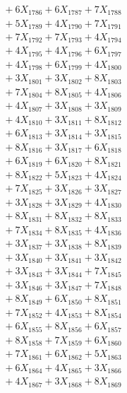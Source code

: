 \documentclass[a4paper,10pt]{article}
\begin{document}
{\begin{align}
&\;  + 6 X_{1786} + 6 X_{1787} + 7 X_{1788} \\[0.3ex]
&\;  + 5 X_{1789} + 4 X_{1790} + 7 X_{1791} \\[0.3ex]
&\;  + 7 X_{1792} + 7 X_{1793} + 4 X_{1794} \\[0.3ex]
&\;  + 4 X_{1795} + 4 X_{1796} + 6 X_{1797} \\[0.3ex]
&\;  + 4 X_{1798} + 6 X_{1799} + 4 X_{1800} \\[0.3ex]
&\;  + 3 X_{1801} + 3 X_{1802} + 8 X_{1803} \\[0.3ex]
&\;  + 7 X_{1804} + 8 X_{1805} + 4 X_{1806} \\[0.3ex]
&\;  + 4 X_{1807} + 3 X_{1808} + 3 X_{1809} \\[0.5ex]\allowbreak
&\;  + 4 X_{1810} + 3 X_{1811} + 8 X_{1812} \\[0.3ex]
&\;  + 6 X_{1813} + 3 X_{1814} + 3 X_{1815} \\[0.3ex]
&\;  + 8 X_{1816} + 3 X_{1817} + 6 X_{1818} \\[0.3ex]
&\;  + 6 X_{1819} + 6 X_{1820} + 8 X_{1821} \\[0.3ex]
&\;  + 8 X_{1822} + 5 X_{1823} + 4 X_{1824} \\[0.3ex]
&\;  + 7 X_{1825} + 3 X_{1826} + 3 X_{1827} \\[0.3ex]
&\;  + 3 X_{1828} + 3 X_{1829} + 4 X_{1830} \\[0.3ex]
&\;  + 8 X_{1831} + 8 X_{1832} + 8 X_{1833} \\[0.3ex]
&\;  + 7 X_{1834} + 8 X_{1835} + 4 X_{1836} \\[0.3ex]
&\;  + 3 X_{1837} + 3 X_{1838} + 8 X_{1839} \\[0.5ex]\allowbreak
&\;  + 3 X_{1840} + 3 X_{1841} + 3 X_{1842} \\[0.3ex]
&\;  + 3 X_{1843} + 3 X_{1844} + 7 X_{1845} \\[0.3ex]
&\;  + 3 X_{1846} + 3 X_{1847} + 7 X_{1848} \\[0.3ex]
&\;  + 8 X_{1849} + 6 X_{1850} + 8 X_{1851} \\[0.3ex]
&\;  + 7 X_{1852} + 4 X_{1853} + 8 X_{1854} \\[0.3ex]
&\;  + 6 X_{1855} + 8 X_{1856} + 6 X_{1857} \\[0.3ex]
&\;  + 8 X_{1858} + 7 X_{1859} + 6 X_{1860} \\[0.3ex]
&\;  + 7 X_{1861} + 6 X_{1862} + 5 X_{1863} \\[0.3ex]
&\;  + 6 X_{1864} + 4 X_{1865} + 3 X_{1866} \\[0.3ex]
&\;  + 4 X_{1867} + 3 X_{1868} + 8 X_{1869} \\[0.5ex]\allowbreak

\end{align}}
\end{document}
